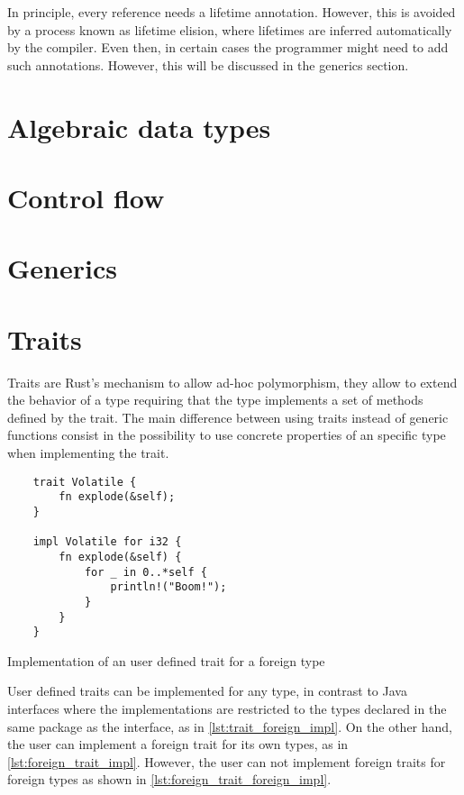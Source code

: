 In principle, every reference needs a lifetime annotation. However, this is avoided by a process known as lifetime elision, where lifetimes are inferred automatically by the compiler. Even then, in certain cases the programmer might need to add such annotations. However, this will be discussed in the generics section.

\section{Algebraic data types}
\section{Control flow}
\section{Generics}

\section{Traits}
Traits are Rust's mechanism to allow ad-hoc polymorphism, they allow to extend the behavior of a type requiring that the type implements a set of methods defined by the trait. The main difference between using traits instead of generic functions consist in the possibility to use concrete properties of an specific type when implementing the trait. \cite{traits}

\begin{listing}[ht]
	\begin{verbatim}
    trait Volatile {
        fn explode(&self);
    }

    impl Volatile for i32 {
        fn explode(&self) {
            for _ in 0..*self {
                println!("Boom!");
            }
        }
    }
    \end{verbatim}
  \caption{Implementation of an user defined trait for a foreign type}
  \label{lst:trait_foreign_impl}
\end{listing}

User defined traits can be implemented for any type, in contrast to Java interfaces where the implementations are restricted to the types declared in the same package as the interface, as in \ref{lst:trait_foreign_impl}. On the other hand, the user can implement a foreign trait for its own types, as in \ref{lst:foreign_trait_impl}. However, the user can not implement foreign traits for foreign types as shown in \ref{lst:foreign_trait_foreign_impl}.

